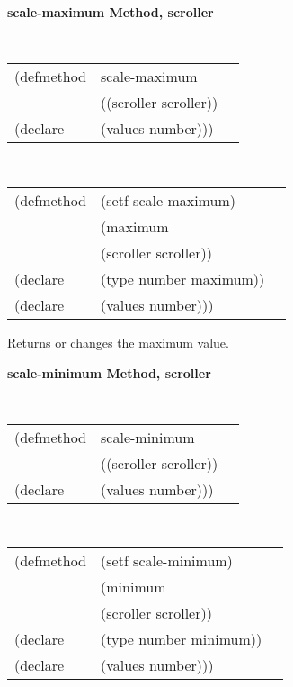 {\samepage  
{\large {\bf scale-maximum \hfill Method, scroller}}
\begin{flushright} \parbox[t]{6.125in}{
\tt
\begin{tabular}{lll}
\raggedright
(defmethod & scale-maximum & \\
& ((scroller  scroller)) \\
(declare & (values number)))
\end{tabular}
\rm

}\end{flushright}}

\begin{flushright} \parbox[t]{6.125in}{
\tt
\begin{tabular}{lll}
\raggedright
(defmethod & (setf scale-maximum) & \\
         & (maximum \\
         & (scroller  scroller)) \\
(declare &(type number  maximum))\\
(declare & (values number)))
\end{tabular}
\rm}
\end{flushright}

\begin{flushright} \parbox[t]{6.125in}{
Returns or changes the maximum value.}
\end{flushright}




{\samepage  
{\large {\bf scale-minimum \hfill Method, scroller}}
\begin{flushright} \parbox[t]{6.125in}{
\tt
\begin{tabular}{lll}
\raggedright
(defmethod & scale-minimum & \\
& ((scroller  scroller)) \\
(declare & (values number)))
\end{tabular}
\rm

}\end{flushright}}

\begin{flushright} \parbox[t]{6.125in}{
\tt
\begin{tabular}{lll}
\raggedright
(defmethod & (setf scale-minimum) & \\
         & (minimum \\
         & (scroller  scroller)) \\
(declare &(type number  minimum))\\
(declare & (values number)))
\end{tabular}
\rm}
\end{flushright}

